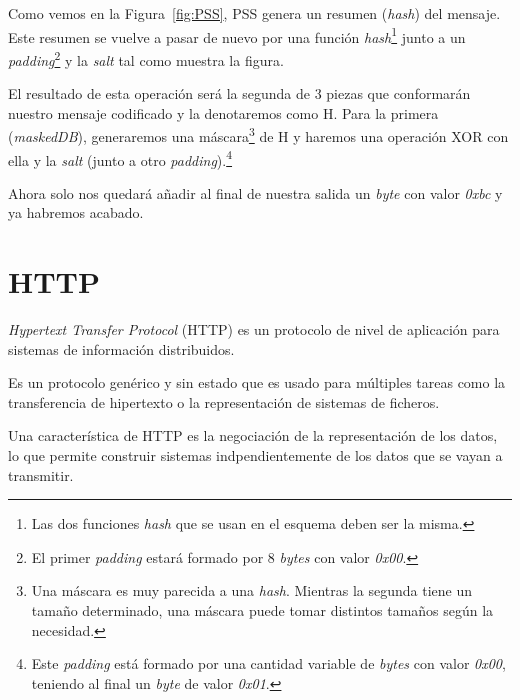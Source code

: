 Como vemos en la Figura~\ref{fig:PSS}, PSS genera un resumen (\emph{hash}) del mensaje. Este resumen se vuelve a pasar de nuevo por una función \emph{hash}\footnote{Las dos funciones \emph{hash} que se usan en el esquema deben ser la misma.} junto a un \emph{padding}\footnote{El primer \emph{padding} estará formado por 8 \emph{bytes} con valor \emph{0x00}.} y la \emph{salt} tal como muestra la figura.

El resultado de esta operación será la segunda de 3 piezas que conformarán nuestro mensaje codificado y la denotaremos como H. Para la primera (\emph{maskedDB}), generaremos una máscara\footnote{Una máscara es muy parecida a una \emph{hash}. Mientras la segunda tiene un tamaño determinado, una máscara puede tomar distintos tamaños según la necesidad.} de H y haremos una operación XOR con ella y la \emph{salt} (junto a otro \emph{padding}).\footnote{Este \emph{padding} está formado por una cantidad variable de \emph{bytes} con valor \emph{0x00}, teniendo al final un \emph{byte} de valor \emph{0x01}.}

Ahora solo nos quedará añadir al final de nuestra salida un \emph{byte} con valor \emph{0xbc} y ya habremos acabado. \emph{\parencite{Reference17}}


\section{HTTP}

\emph{Hypertext Transfer Protocol} (HTTP) es un protocolo de nivel de aplicación para sistemas de información distribuidos.

Es un protocolo genérico y sin estado que es usado para múltiples tareas como la transferencia de hipertexto o la representación de sistemas de ficheros.

Una característica de HTTP es la negociación de la representación de los datos, lo que permite construir sistemas indpendientemente de los datos que se vayan a transmitir. \emph{\parencite{Reference18}}
